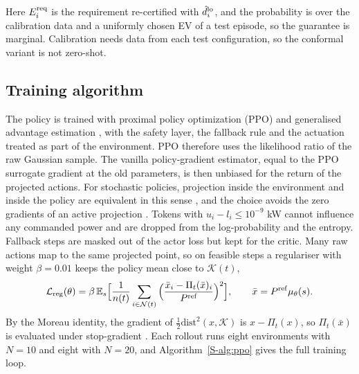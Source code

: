 Here $E^{\mathrm{req}}_i$ is the requirement re-certified with $\hat d_i^{\mathrm{lo}}$, and the probability is over the calibration data and a uniformly chosen EV of a test episode, so the guarantee is marginal.
Calibration needs data from each test configuration, so the conformal variant is not zero-shot.

\subsection{Training algorithm}\label{sec:training}

The policy is trained with proximal policy optimization (PPO) \cite{schulman2017proximal} and generalised advantage estimation \cite{schulman2016highdimensional}, with the safety layer, the fallback rule and the actuation treated as part of the environment.
PPO therefore uses the likelihood ratio of the raw Gaussian sample.
The vanilla policy-gradient estimator, equal to the PPO surrogate gradient at the old parameters, is then unbiased for the return of the projected actions.
For stochastic policies, projection inside the environment and inside the policy are equivalent in this sense \cite{markgraf2025safe}, and the choice avoids the zero gradients of an active projection \cite{kasaura2023benchmarking}.
Tokens with $u_i-l_i\le10^{-9}$ kW cannot influence any commanded power and are dropped from the log-probability and the entropy.
Fallback steps are masked out of the actor loss but kept for the critic.
Many raw actions map to the same projected point, so on feasible steps a regulariser with weight $\beta=0.01$ keeps the policy mean close to $\mathcal K(t)$,
\begin{equation}\label{eq:reg}
\mathcal L_{\mathrm{reg}}(\theta)=\beta\,\mathbb E_{s}\Big[\frac1{n(t)}\sum_{i\in\mathcal N(t)}\Big(\frac{\bar x_i-\Pi_t(\bar x)_i}{P^{\mathrm{ref}}}\Big)^{2}\Big],\qquad \bar x=P^{\mathrm{ref}}\mu_\theta(s).
\end{equation}
By the Moreau identity, the gradient of $\tfrac12\mathrm{dist}^2(x,\mathcal K)$ is $x-\Pi_t(x)$, so $\Pi_t(\bar x)$ is evaluated under stop-gradient \cite{chen2021enforcing,markgraf2025safe}.
Each rollout runs eight environments with $N=10$ and eight with $N=20$, and Algorithm~\ref{S-alg:ppo} gives the full training loop.
